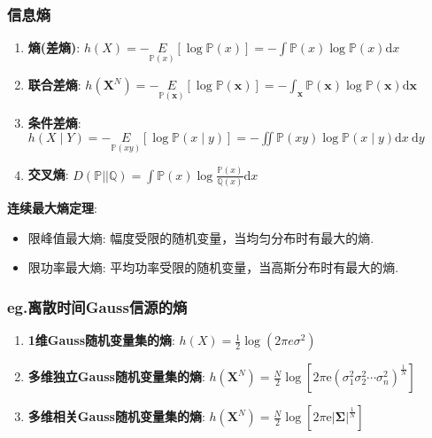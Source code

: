 \documentclass{article}
\begin{document}
        \subsubsection{信息熵}
            \begin{enumerate}
                \item \textbf{熵(差熵)}: $h(X)=-\underset{\mathbb P(x)}{E}[\log \mathbb P(x)]=-\int \mathbb P(x) \log \mathbb P(x) \mathrm{d} x$
                \item \textbf{联合差熵}: $h\left(\boldsymbol{X}^{N}\right)=-\underset{\mathbb P(\boldsymbol{x})}{E}[\log \mathbb P(\boldsymbol{x})]=-\int_{\boldsymbol{x}} \mathbb P(\boldsymbol{x}) \log \mathbb P(\boldsymbol{x}) \mathrm{d} \boldsymbol{x}$
                \item \textbf{条件差熵}: $h(X \mid Y)=-\underset{\mathbb P(x y)}{E}[\log \mathbb P(x \mid y)]=-\iint \mathbb P(x y) \log \mathbb P(x \mid y) \mathrm{d} x \mathrm{~d} y$
                \item \textbf{交叉熵}: $D(\mathbb P || \mathbb Q)=\int \mathbb P(x) \log \frac{\mathbb P(x)}{\mathbb Q(x)} \mathrm{d} x$
            \end{enumerate}
            
            \textbf{连续最大熵定理}:
                \begin{itemize}
                    \item 限峰值最大熵: 幅度受限的随机变量，当均匀分布时有最大的熵.
                    \item 限功率最大熵: 平均功率受限的随机变量，当高斯分布时有最大的熵.
                \end{itemize}
            
        \subsubsection{\textbf{eg.}离散时间Gauss信源的熵}
            \begin{enumerate}
                \item \textbf{1维Gauss随机变量集的熵}: $h(X)=\frac{1}{2} \log \left(2 \pi e \sigma^{2}\right)$
                \item \textbf{多维独立Gauss随机变量集的熵}: $h\left(\boldsymbol{X}^{N}\right)=\frac{N}{2} \log \left[2 \pi \mathrm{e}\left(\sigma_{1}^{2} \sigma_{2}^{2} \cdots \sigma_{n}^{2}\right)^{\frac{1}{N}}\right]$
                \item \textbf{多维相关Gauss随机变量集的熵}: $h\left(\boldsymbol{X}^{N}\right)=\frac{N}{2} \log \left[2 \pi \mathrm{e} |\boldsymbol \Sigma|^{\frac{1}{N}}\right]$
            \end{enumerate}
            
\end{document}
